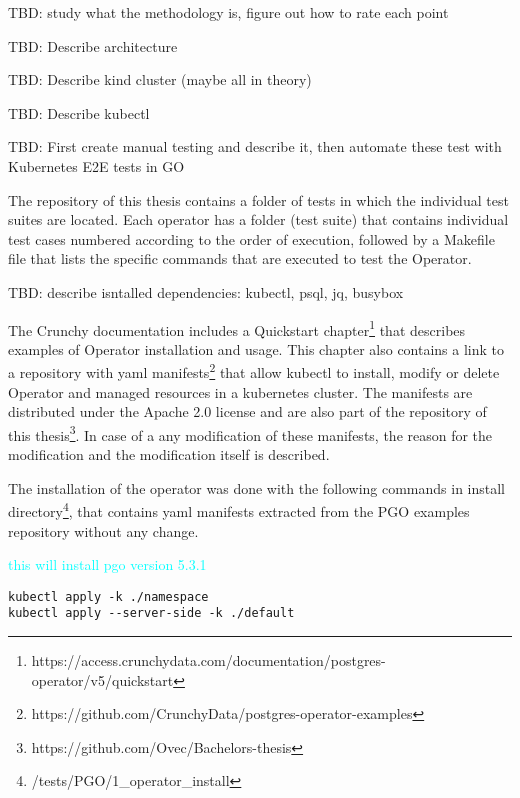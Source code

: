 TBD: study what the methodology is, figure out how to rate each point










TBD: Describe architecture

TBD: Describe kind cluster (maybe all in theory)

TBD: Describe kubectl

TBD: First create manual testing and describe it, then automate these test with Kubernetes E2E tests in GO

The repository of this thesis contains a folder of tests in which the individual test suites are located. Each operator has a folder (test suite) that contains individual test cases numbered according to the order of execution, followed by a Makefile file that lists the specific commands that are executed to test the Operator.

TBD: describe isntalled dependencies: kubectl, psql, jq, busybox

\pagebreak
{}
The Crunchy documentation includes a Quickstart chapter\footnote{https://access.crunchydata.com/documentation/postgres-operator/v5/quickstart} that describes examples of Operator installation and usage. This chapter also contains a link to a repository with yaml manifests\footnote{https://github.com/CrunchyData/postgres-operator-examples} that allow kubectl to install, modify or delete Operator and managed resources in a kubernetes cluster. The manifests are distributed under the Apache 2.0 license and are also part of the repository of this thesis\footnote{https://github.com/Ovec/Bachelors-thesis}. In case of a any modification of these manifests, the reason for the modification and the modification itself is described.



The installation of the operator was done with the following commands in install directory\footnote{/tests/PGO/1\_operator\_install}, that contains yaml manifests extracted from the PGO examples repository without any change.

\textcolor{cyan}{this will install pgo version 5.3.1}

\begin{verbatim}
kubectl apply -k ./namespace
kubectl apply --server-side -k ./default
\end{verbatim}

